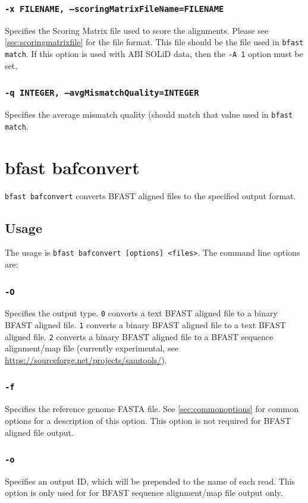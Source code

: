 \documentclass[a4paper,12pt]{book}
\newcommand{\TT}[1]{{\tt #1}} %
\newcommand{\rGFF}{reference genome FASTA file}
\newcommand{\BAF}{BFAST aligned file} %
\newcommand{\BSAMF}{BFAST sequence alignment/map file} %
\begin{document}
\subsubsection{\TT{-x FILENAME, --scoringMatrixFileName=FILENAME}}
Specifies the Scoring Matrix file used to score the alignments.
Please see \autoref{sec:scoringmatrixfile} for the file format.
This file should be the file used in \TT{bfast match}.
If this option is used with ABI SOLiD data, then the \TT{-A 1} option must be set.

\subsubsection{\TT{-q INTEGER, --avgMismatchQuality=INTEGER}}
Specifies the average mismatch quality (should match that value used in \TT{bfast match}.

\section{bfast bafconvert}
\label{sec:bafconvert}
\TT{bfast bafconvert} converts \BAF{s} to the specified output format.
\subsection{Usage}
The usage is \TT{bfast bafconvert [options] <files>}.
The command line options are:
\subsubsection{\TT{-O}}
Specifies the output type.
\TT{0} converts a text \BAF{} to a binary \BAF{}.
\TT{1} converts a binary \BAF{} to a text \BAF{}.
\TT{2} converts a binary \BAF{} to a \BSAMF{} (currently experimental, see \url{https://sourceforge.net/projects/samtools/}).
\subsubsection{\TT{-f}}
Specifies the \rGFF{}.
See \autoref{sec:commonoptions} for common options for a description of this option.
This option is not required for \BAF{} output.
\subsubsection{\TT{-o}}
Specifies an output ID, which will be prepended to the name of each read.
This option is only used for for \BSAMF{} output only.
\end{document}
